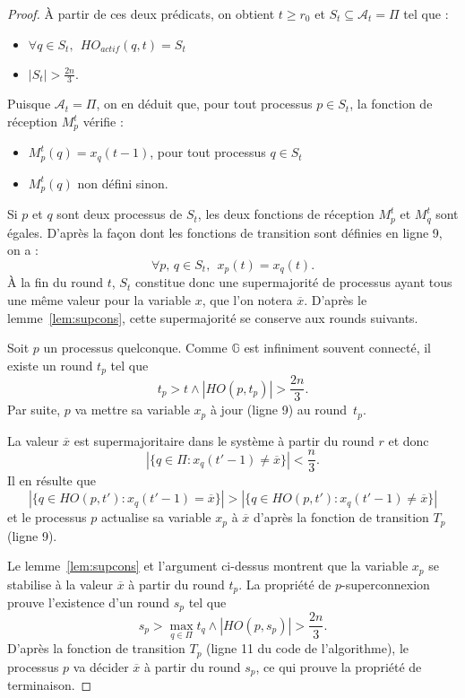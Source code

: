\documentclass{article}
\begin{document}
\begin{proof}

	À partir de ces deux prédicats, on obtient $t \geq r_0 $ et $S_t \subseteq \mathcal{A}_t = \Pi $ tel que :
	\begin{itemize}

		\item $\forall q \in S_t, \ \ HO_{actif}(q, t ) = S_t $
		\item $|S_t | > \frac{2 n}{3}$.

	\end{itemize}

	Puisque $\mathcal{A}_t = \Pi $, on en déduit que, pour tout processus $p \in S_t$, la fonction de réception $M_p^t$  v\'erifie :
	\begin{itemize}

		\item $M_p^t (q) = x_q( t-1 )$,  pour tout processus $q \in S_t$
		\item $M_p^t (q)  $ non défini sinon.

	\end{itemize}

Si $p$ et $q$ sont deux processus de $S_t$,   les deux fonctions de r\'eception
	$ M_p^t$ et $ M_q^t$ sont \'egales.
D'après la façon dont les fonctions de transition sont d\'efinies en ligne 9, on a :
	 $$ \forall p, \, q \in S_t, \ \ x_p(t) = x_q(t)   .$$
À la fin du round $t$, $S_t$ constitue donc une supermajorité de processus ayant tous une même valeur pour la variable $x$, 
	que l'on notera $\overline{x}$.
D'après le lemme~\ref{lem:supcons}, cette supermajorité se conserve aux rounds suivants.
	
Soit $p$ un processus quelconque.
Comme $\mathds{G}$ est infiniment souvent  connect\'e, il existe un round $t_p$ 
	tel que 
	$$ t_p >t \wedge | HO (p,t_p)  | > \frac{2 n}{3} . $$
Par suite, $p$ va mettre sa variable $x_p$ \`a jour (ligne 9) au round~$t_p$.

La valeur $\overline{x}$ est supermajoritaire dans le syst\`eme \`a partir du round $r$ et donc 
	$$ | \{ q\in \Pi : x_q(t'-1) \neq \overline{x}  \} | < \frac{n}{3} .$$
Il en r\'esulte que 
	$$  | \{ q\in HO(p,t')  : x_q(t'-1) =   \overline{x}  \} | >   | \{ q\in HO(p,t')  : x_q(t'-1) \neq   \overline{x}  \} | $$ 
	et le processus $p$ actualise sa variable $x_p$ \`a $\overline{x} $ d'apr\`es la fonction de transition $T_p$ 
	(ligne 9).

Le lemme~\ref{lem:supcons} et l'argument ci-dessus montrent que la variable $x_p$ se stabilise \`a la valeur
	$\overline{x} $  \`a partir du round $t_p$.
La propri\'et\'e de $p$-superconnexion prouve l'existence d'un round $s_p$ tel que
	$$ s_p > \max_{q\in\Pi} t_q \wedge | HO (p,s_p)  | > \frac{2 n}{3} . $$
D'apr\`es la fonction de transition $T_p$ (ligne 11 du code de l'algorithme), le processus $p$ va d\'ecider
	$\overline{x} $  \`a partir du round $s_p$, ce qui prouve la propri\'et\'e de terminaison.
\end{proof}
\end{document}
